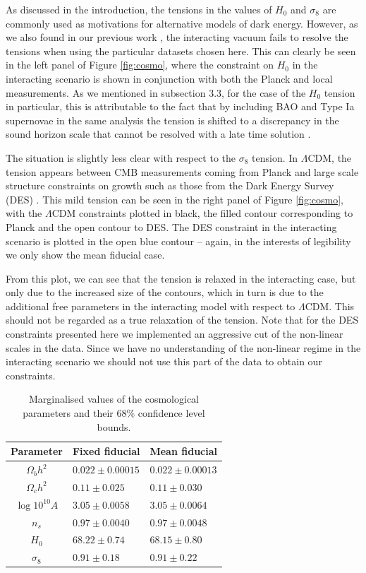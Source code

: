\documentclass[final,3p,times,twocolumn]{elsarticle}
\begin{document}
As discussed in the introduction, the tensions in the values of $H_0$ and $\sigma_8$ are commonly used as motivations for alternative models of dark energy. However, as we also found in our previous work \cite{Martinelli:2019dau}, the interacting vacuum fails to resolve the tensions when using the particular datasets chosen here. This can clearly be seen in the left panel of Figure \ref{fig:cosmo}, where the constraint on $H_0$ in the interacting scenario is shown in conjunction with both the Planck and local measurements. As we mentioned in subsection 3.3, for the case of the $H_0$ tension in particular, this is attributable to the fact that by including BAO and Type Ia supernovae in the same analysis the tension is shifted to a discrepancy in the sound horizon scale that cannot be resolved with a late time solution \cite{Aylor:2018drw,Arendse:2019hev,Knox:2019rjx}.

The situation is slightly less clear with respect to the $\sigma_8$ tension. In $\Lambda$CDM, the tension appears between CMB measurements coming from Planck and large scale structure constraints on growth such as those from the Dark Energy Survey (DES) \cite{Abbott:2017wau}. This mild tension can be seen in the right panel of Figure \ref{fig:cosmo}, with the $\Lambda$CDM constraints plotted in black, the filled contour corresponding to Planck and the open contour to DES. The DES constraint in the interacting scenario is plotted in the open blue contour -- again, in the interests of legibility we only show the mean fiducial case.

From this plot, we can see that the tension is relaxed in the interacting case, but only due to the increased size of the contours, which in turn is due to the additional free parameters in the interacting model with respect to $\Lambda$CDM. This should not be regarded as a true relaxation of the tension. Note that for the DES constraints presented here we implemented an aggressive cut of the non-linear scales in the data. Since we have no understanding of the non-linear regime in the interacting scenario we should not use this part of the data to obtain our constraints.

\begin{table}
\centering
\begin{tabular}{|c|l|l|}
\hline
Parameter &  Fixed fiducial & Mean fiducial\\
\hline
$\Omega_b h^2$   & $0.022 \pm 0.00015$ & $0.022 \pm 0.00013$ \\
$\Omega_c h^2$   & $0.11  \pm 0.025$   & $0.11 \pm 0.030$ \\
$\log 10^{10} A$ & $3.05  \pm 0.0058$  & $3.05  \pm	0.0064$ \\
$n_s$            & $0.97  \pm 0.0040$  & $0.97 \pm 0.0048$\\
$H_0$            & $68.22 \pm 0.74$    & $68.15  \pm 0.80$\\
$\sigma_8$       & $0.91  \pm 0.18$    & $0.91   \pm 0.22$\\
\hline
\end{tabular}
\caption{Marginalised values of the cosmological parameters and their $68\%$ confidence level bounds. }\label{tab:cosmoresults}
\end{table}
\end{document}
